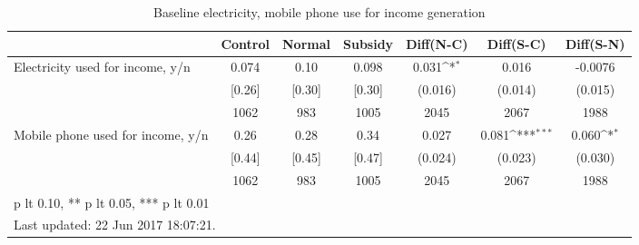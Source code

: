 \begin{table}[htbp]\centering
\def\sym#1{\ifmmode^{#1}\else\(^{#1}\)\fi}
\caption{Baseline electricity, mobile phone use for income generation \label{tab:"balance"}}
\begin{tabular*}{1\hsize}{@{\hskip\tabcolsep\extracolsep\fill}l*{1}{cccccc}}
\toprule
                                &  Control&   Normal&  Subsidy&Diff(N-C)         &Diff(S-C)         &Diff(S-N)         \\
\midrule
Electricity used for income, y/n&    0.074&     0.10&    0.098&    0.031\sym{*}  &    0.016         &  -0.0076         \\
                                &   [0.26]&   [0.30]&   [0.30]&  (0.016)         &  (0.014)         &  (0.015)         \\
                                &     1062&      983&     1005&     2045         &     2067         &     1988         \\
Mobile phone used for income, y/n&     0.26&     0.28&     0.34&    0.027         &    0.081\sym{***}&    0.060\sym{*}  \\
                                &   [0.44]&   [0.45]&   [0.47]&  (0.024)         &  (0.023)         &  (0.030)         \\
                                &     1062&      983&     1005&     2045         &     2067         &     1988         \\
\bottomrule
\multicolumn{7}{l}{\footnotesize * p lt 0.10, ** p lt 0.05, *** p lt 0.01}\\
\multicolumn{7}{l}{\footnotesize Last updated: 22 Jun 2017 18:07:21.}\\
\end{tabular*}
\end{table}
